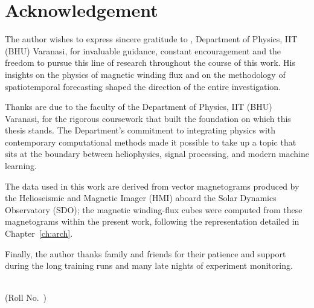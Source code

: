 \chapter*{Acknowledgement}

\vspace{1cm}

The author wishes to express sincere gratitude to \thesupervisor, Department of
Physics, IIT (BHU) Varanasi, for invaluable guidance, constant encouragement
and the freedom to pursue this line of research throughout the course of this
work. His insights on the physics of magnetic winding flux and on the
methodology of spatiotemporal forecasting shaped the direction
of the entire investigation.

Thanks are due to the faculty of the Department of Physics, IIT (BHU)
Varanasi, for the rigorous coursework that built the foundation on which this
thesis stands. The Department's commitment to integrating physics with
contemporary computational methods made it possible to take up a topic that
sits at the boundary between heliophysics, signal processing, and modern
machine learning.

The data used in this work are derived from vector magnetograms produced by
the Helioseismic and Magnetic Imager (HMI) aboard the Solar Dynamics
Observatory (SDO); the magnetic winding-flux cubes were computed from these
magnetograms within the present work, following the representation detailed in
Chapter~\ref{ch:arch}.

Finally, the author thanks family and friends for their patience
and support during the long training runs and many late nights of
experiment monitoring.

\vspace{2cm}

\noindent
\hfill \theauthorname\\
\hfill (Roll No.~\therollnumber)
